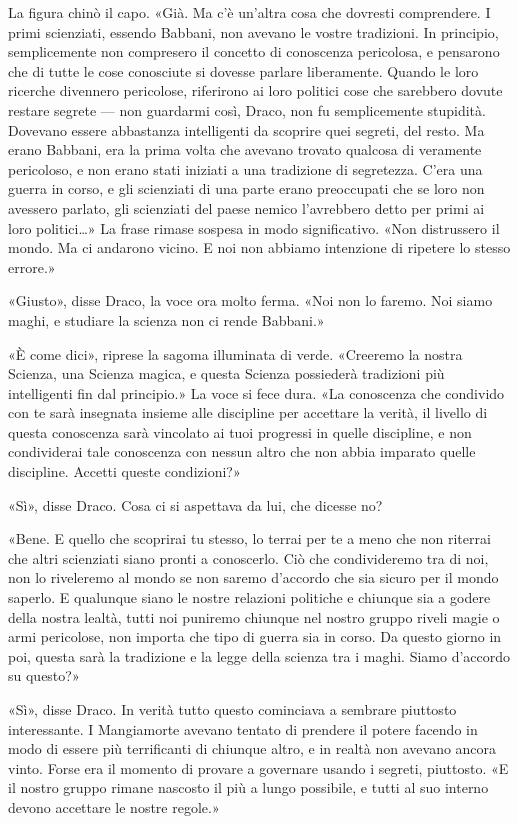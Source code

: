 La figura chinò il capo. «Già. Ma c’è un’altra cosa che dovresti comprendere. I primi scienziati, essendo Babbani, non avevano le vostre tradizioni. In principio, semplicemente non compresero il concetto di conoscenza pericolosa, e pensarono che di tutte le cose conosciute si dovesse parlare liberamente. Quando le loro ricerche divennero pericolose, riferirono ai loro politici cose che sarebbero dovute restare segrete — non guardarmi così, Draco, non fu semplicemente stupidità. Dovevano essere abbastanza intelligenti da scoprire quei segreti, del resto. Ma erano Babbani, era la prima volta che avevano trovato qualcosa di veramente pericoloso, e non erano stati iniziati a una tradizione di segretezza. C’era una guerra in corso, e gli scienziati di una parte erano preoccupati che se loro non avessero parlato, gli scienziati del paese nemico l’avrebbero detto per primi ai loro politici…» La frase rimase sospesa in modo significativo. «Non distrussero il mondo. Ma ci andarono vicino. E noi non abbiamo intenzione di ripetere lo stesso errore.»

«Giusto», disse Draco, la voce ora molto ferma. «Noi non lo faremo. Noi siamo maghi, e studiare la scienza non ci rende Babbani.»

«È come dici», riprese la sagoma illuminata di verde. «Creeremo la nostra Scienza, una Scienza magica, e questa Scienza possiederà tradizioni più intelligenti fin dal principio.» La voce si fece dura. «La conoscenza che condivido con te sarà insegnata insieme alle discipline per accettare la verità, il livello di questa conoscenza sarà vincolato ai tuoi progressi in quelle discipline, e non condividerai tale conoscenza con nessun altro che non abbia imparato quelle discipline. Accetti queste condizioni?»

«Sì», disse Draco. Cosa ci si aspettava da lui, che dicesse no?

«Bene. E quello che scoprirai tu stesso, lo terrai per te a meno che non riterrai che altri scienziati siano pronti a conoscerlo. Ciò che condivideremo tra di noi, non lo riveleremo al mondo se non saremo d’accordo che sia sicuro per il mondo saperlo. E qualunque siano le nostre relazioni politiche e chiunque sia a godere della nostra lealtà, tutti noi puniremo chiunque nel nostro gruppo riveli magie o armi pericolose, non importa che tipo di guerra sia in corso. Da questo giorno in poi, questa sarà la tradizione e la legge della scienza tra i maghi. Siamo d’accordo su questo?»

«Sì», disse Draco. In verità tutto questo cominciava a sembrare piuttosto interessante. I Mangiamorte avevano tentato di prendere il potere facendo in modo di essere più terrificanti di chiunque altro, e in realtà non avevano ancora vinto. Forse era il momento di provare a governare usando i segreti, piuttosto. «E il nostro gruppo rimane nascosto il più a lungo possibile, e tutti al suo interno devono accettare le nostre regole.»

